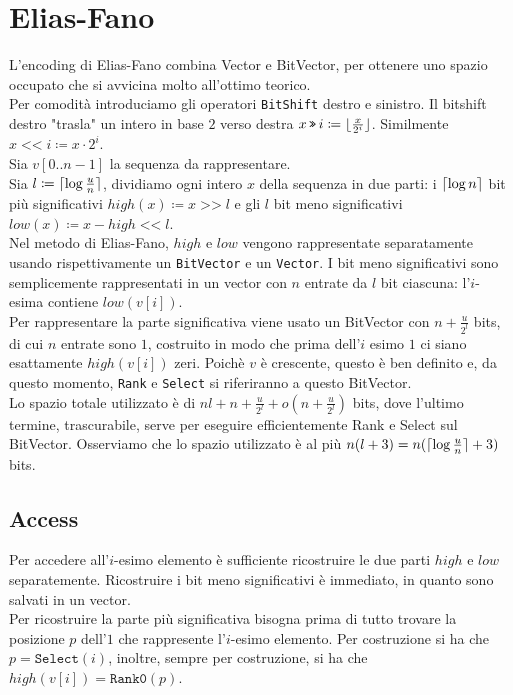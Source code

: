 \documentclass{article}
\DeclarePairedDelimiter\ceil{\lceil}{\rceil}
\DeclarePairedDelimiter\floor{\lfloor}{\rfloor}
\newcommand{\ttt}{\texttt}
\newcommand{\clg}[1]{\ensuremath \ceil{\log #1}}
\DeclareMathOperator\Lshift{\ttt{<<}}
\DeclareMathOperator\Rshift{\ttt{>>}}
\begin{document}
\section{Elias-Fano}
L'encoding di Elias-Fano combina Vector e BitVector, per ottenere uno spazio occupato che si avvicina molto all'ottimo teorico.\\
Per comodit\`a introduciamo gli operatori \ttt{BitShift} destro e sinistro. Il bitshift destro "trasla" un intero in base $2$ verso destra $x \Rshift i \coloneq \floor{\frac{x}{2^i}}$. Similmente $x \Lshift i \coloneq x \cdot 2^i$.\\
Sia $v[0..n-1]$ la sequenza da rappresentare.\\
Sia $l \coloneq \clg{\frac{u}{n}}$, dividiamo ogni intero $x$ della sequenza in due parti: i $\clg{n}$ bit pi\`u significativi $high(x) \coloneq x \Rshift l$ e gli $l$ bit meno significativi $low(x) \coloneq x - high \Lshift l$.\\
Nel metodo di Elias-Fano, $high$ e $low$ vengono rappresentate separatamente usando rispettivamente un \ttt{BitVector} e un \ttt{Vector}. I bit meno significativi sono semplicemente rappresentati in un vector con $n$ entrate da $l$ bit ciascuna: l'$i$-esima contiene $low(v[i])$.\\
Per rappresentare la parte significativa viene usato un BitVector con $n + \frac{u}{2^l}$ bits, di cui $n$ entrate sono $1$, costruito in modo che prima dell'$i$ esimo $1$ ci siano esattamente $high(v[i])$ zeri.
Poich\`e $v$ \`e crescente, questo \`e ben definito e, da questo momento, \ttt{Rank} e \ttt{Select} si riferiranno a questo BitVector.\\
Lo spazio totale utilizzato \`e di $n l + n + \frac{u}{2^l} + o(n + \frac{u}{2^l})$ bits, dove l'ultimo termine, trascurabile, serve per eseguire efficientemente Rank e Select sul BitVector. Osserviamo che lo spazio utilizzato \`e al pi\`u $n (l + 3) = n (\clg{\frac{u}{n}} + 3)$ bits.

\subsection{Access}
Per accedere all'$i$-esimo elemento \`e sufficiente ricostruire le due parti $high$ e $low$ separatemente. Ricostruire i bit meno significativi \`e immediato, in quanto sono salvati in un vector.\\
Per ricostruire la parte pi\`u significativa bisogna prima di tutto trovare la posizione $p$ dell'$1$ che rappresente l'$i$-esimo elemento. Per costruzione si ha che $p = \ttt{Select}(i)$, inoltre, sempre per costruzione, si ha che $high(v[i]) = \ttt{Rank0}(p)$.
\end{document}
